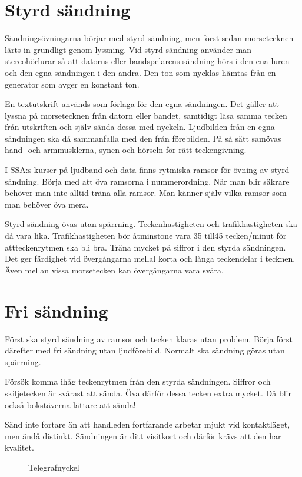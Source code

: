 \section{Styrd sändning}

Sändningsövningarna börjar med styrd sändning, men först sedan morsetecknen
lärts in grundligt genom lyssning. Vid styrd sändning använder man
stereohörlurar så att datorns eller bandspelarens sändning hörs i den ena luren
och den egna sändningen i den andra. Den ton som nycklas hämtas från en
generator som avger en konstant ton.

En textutskrift används som förlaga för den egna sändningen. Det gäller att
lyssna på morsetecknen från datorn eller bandet, samtidigt läsa samma tecken
från utskriften och själv sända dessa med nyckeln. Ljudbilden från en egna
sändningen ska då sammanfalla med den från förebilden. På så sätt samövas
hand- och armmusklerna, synen och hörseln för rätt teckengivning.

I SSA:s kurser på ljudband och data finns rytmiska ramsor för övning av styrd
sändning. Börja med att öva ramsorna i nummerordning. När man blir säkrare
behöver man inte alltid träna alla ramsor. Man känner själv vilka ramsor som man
behöver öva mera.

Styrd sändning övas utan spärrning. Teckenhastigheten och trafikhastigheten ska
då vara lika. Trafikhastigheten bör åtminstone vara 35 till45 tecken/minut för
attteckenrytmen ska bli bra. Träna mycket på siffror i den styrda
sändningen. Det ger färdighet vid övergångarna mellal korta och långa
teckendelar i tecknen. Även mellan vissa morsetecken kan övergångarna vara
svåra.

\section{Fri sändning}

Först ska styrd sändning av ramsor och tecken klaras utan problem. Börja först
därefter med fri sändning utan ljudförebild. Normalt ska sändning göras utan
spärrning.

Försök komma ihåg teckenrytmen från den styrda sändningen. Siffror och
skiljetecken är svårast att sända. Öva därför dessa tecken extra mycket. Då blir
också bokstäverna lättare att sända!

Sänd inte fortare än att handleden fortfarande arbetar mjukt vid kontaktläget,
men ändå distinkt. Sändningen är ditt visitkort och därför krävs att den har
kvalitet.

\begin{figure}
  \caption{Telegrafnyckel}
  \label{fig:bild_morse_6}
\end{figure}


